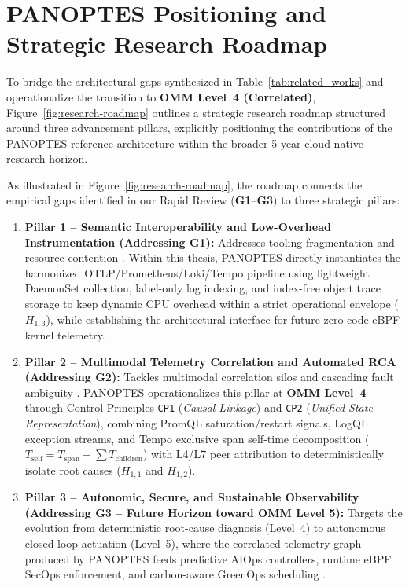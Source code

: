 \section{PANOPTES Positioning and Strategic Research Roadmap}
\label{sec:panoptes-positioning}

To bridge the architectural gaps synthesized in Table~\ref{tab:related_works} and operationalize the transition to \textbf{OMM Level~4 (Correlated)}, Figure~\ref{fig:research-roadmap} outlines a strategic research roadmap structured around three advancement pillars, explicitly positioning the contributions of the PANOPTES reference architecture within the broader 5-year cloud-native research horizon.



As illustrated in Figure~\ref{fig:research-roadmap}, the roadmap connects the empirical gaps identified in our Rapid Review (\textbf{G1}--\textbf{G3}) to three strategic pillars:

\begin{enumerate}
    \item \textbf{Pillar 1 -- Semantic Interoperability and Low-Overhead Instrumentation (Addressing G1):} Addresses tooling fragmentation and resource contention \cite{hartikainen_2024, araujo_2024, zanatta_23}. Within this thesis, PANOPTES directly instantiates the harmonized OTLP/Prometheus/Loki/Tempo pipeline using lightweight DaemonSet collection, label-only log indexing, and index-free object trace storage to keep dynamic CPU overhead within a strict operational envelope ($H_{1,3}$), while establishing the architectural interface for future zero-code eBPF kernel telemetry.
    
    \item \textbf{Pillar 2 -- Multimodal Telemetry Correlation and Automated RCA (Addressing G2):} Tackles multimodal correlation silos and cascading fault ambiguity \cite{deng_2024, han_2024, gomes_2025}. PANOPTES operationalizes this pillar at \textbf{OMM Level~4} through Control Principles \texttt{CP1} (\textit{Causal Linkage}) and \texttt{CP2} (\textit{Unified State Representation}), combining PromQL saturation/restart signals, LogQL exception streams, and Tempo exclusive span self-time decomposition ($T_{\text{self}} = T_{\text{span}} - \sum T_{\text{children}}$) with L4/L7 peer attribution to deterministically isolate root causes ($H_{1,1}$ and $H_{1,2}$).
    
    \item \textbf{Pillar 3 -- Autonomic, Secure, and Sustainable Observability (Addressing G3 -- Future Horizon toward OMM Level 5):} Targets the evolution from deterministic root-cause diagnosis (Level~4) to autonomous closed-loop actuation (Level~5), where the correlated telemetry graph produced by PANOPTES feeds predictive AIOps controllers, runtime eBPF SecOps enforcement, and carbon-aware GreenOps scheduling \cite{deng_2024, kosinska_2023}.
\end{enumerate}


